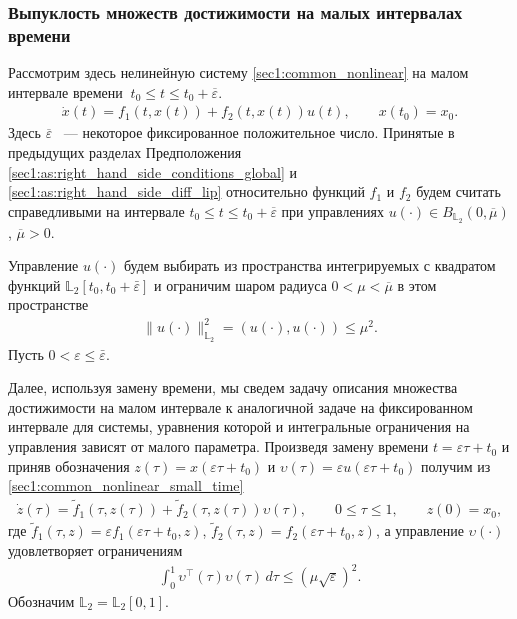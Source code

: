 \documentclass[../main.tex]{subfiles}
\begin{document}
\subsubsection{Выпуклость множеств достижимости на малых интервалах времени}
Рассмотрим здесь нелинейную систему \eqref{sec1:common_nonlinear} на малом интервале времени $\ t_0 \leqslant t \leqslant t_0 + \overline{\varepsilon} $.
\begin{gather}\label{sec1:common_nonlinear_small_time}
    \dot{x}(t)=f_1(t,x(t))+f_2(t,x(t))u(t), \qquad x(t_0) = x_0.
\end{gather}
Здесь $ \overline{\varepsilon} $ ~--- некоторое фиксированное положительное число.
Принятые в предыдущих разделах Предположения \ref{sec1:as:right_hand_side_conditions_global} и \ref{sec1:as:right_hand_side_diff_lip} относительно функций $f_1$ и $f_2$ будем считать справедливыми на интервале $t_0 \leqslant t \leqslant t_0 + \overline{\varepsilon} $ при управлениях $u(\cdot) \in B_{\mathbb{L}_2}(0, \overline{\mu}) $, $\overline{\mu} > 0$.
   

Управление $u(\cdot)$ будем выбирать из пространства интегрируемых с квадратом функций $\mathbb{L}_2[t_0,t_0+\bar{\varepsilon}]$ и ограничим шаром радиуса $  0 < \mu < \overline{\mu} $ в этом пространстве
\begin{gather*}
    \lVert u(\cdot)\rVert^2_{\mathbb{L}_2} = \left(u(\cdot),u(\cdot) \right) \leqslant \mu^2.
\end{gather*}
Пусть $ 0 <  \varepsilon \leqslant \bar{\varepsilon} $.
 
    
Далее, используя замену времени, мы сведем задачу описания множества достижимости на малом интервале к аналогичной задаче на фиксированном интервале для системы, уравнения которой и интегральные ограничения на управления зависят от малого параметра.
Произведя замену времени $ t = \varepsilon \tau + t_0 $ и приняв обозначения $ z(\tau) = x(\varepsilon \tau + t_0) $ и $ \upsilon(\tau) = \varepsilon u(\varepsilon \tau + t_0) $  получим из \eqref{sec1:common_nonlinear_small_time}
\begin{gather}\label{sec1:eps_nonlinear}
    \dot{z}(\tau)=\widetilde{f}_1(\tau,z(\tau))+\widetilde{f}_2(\tau,z(\tau))\upsilon(\tau), \qquad 0 \leqslant \tau \leqslant 1, \qquad z(0) = x_0,
\end{gather}
где $ \widetilde{f}_1(\tau,z) = \varepsilon f_1(\varepsilon \tau + t_0,z) $, $ \widetilde{f}_2 (\tau,z) = f_2(\varepsilon \tau + t_0,z)$, а управление $ \upsilon(\cdot) $ удовлетворяет ограничениям
\begin{gather}\label{sec1:eps_control_constaint}
    \int_0^1 \upsilon^{\top}(\tau) \upsilon(\tau) \, d\tau \leqslant \left( \mu \sqrt{\varepsilon}\right)^2.
\end{gather}
Обозначим $\mathbb{L}_2 = \mathbb{L}_2[0, 1]$. 
\end{document}
